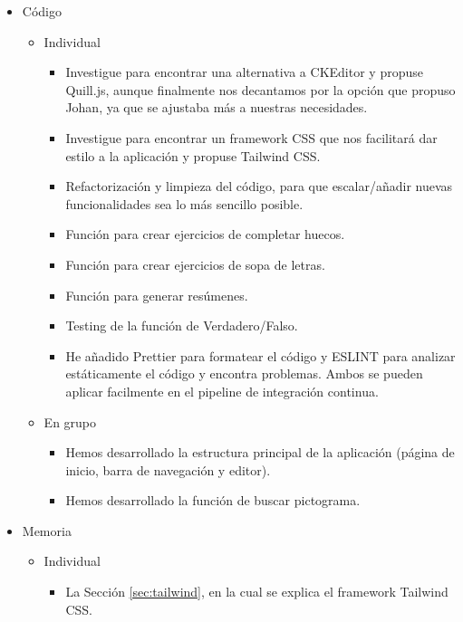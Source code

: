 \begin{itemize}
    \item Código
          \begin{itemize}
              \item Individual
                    \begin{itemize}
                        \item Investigue para encontrar una alternativa a CKEditor y propuse Quill.js, aunque finalmente nos decantamos por la opción que propuso Johan, ya que se ajustaba más a nuestras necesidades.
                        \item Investigue para encontrar un framework CSS que nos facilitará dar estilo a la aplicación y propuse Tailwind CSS.
                        \item Refactorización y limpieza del código, para que escalar/añadir nuevas funcionalidades sea lo más sencillo posible.
                        \item Función para crear ejercicios de completar huecos.
                        \item Función para crear ejercicios de sopa de letras.
                        \item Función para generar resúmenes.
                        \item Testing de la función de Verdadero/Falso.
                        \item He añadido Prettier para formatear el código y ESLINT para analizar estáticamente el código y encontra problemas. Ambos se pueden aplicar facilmente en el pipeline de integración continua.
                    \end{itemize}
              \item En grupo
                    \begin{itemize}
                        \item Hemos desarrollado la estructura principal de la aplicación (página de inicio, barra de navegación y editor).
                        \item Hemos desarrollado la función de buscar pictograma.
                    \end{itemize}
          \end{itemize}
    \item Memoria
          \begin{itemize}
              \item Individual
                    \begin{itemize}
                        \item La Sección \ref{sec:tailwind}, en la cual se explica el framework Tailwind CSS.

\end{itemize}
\end{itemize}
\end{itemize}
